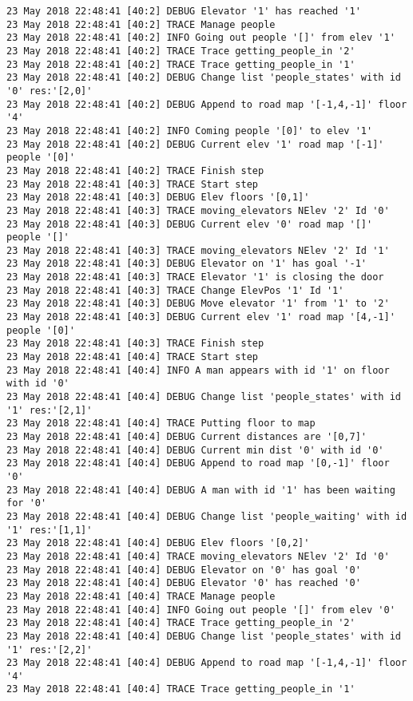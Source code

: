 \begin{lstlisting}[basicstyle=\scriptsize]
23 May 2018 22:48:41 [40:2] DEBUG Elevator '1' has reached '1'
23 May 2018 22:48:41 [40:2] TRACE Manage people
23 May 2018 22:48:41 [40:2] INFO Going out people '[]' from elev '1'
23 May 2018 22:48:41 [40:2] TRACE Trace getting_people_in '2'
23 May 2018 22:48:41 [40:2] TRACE Trace getting_people_in '1'
23 May 2018 22:48:41 [40:2] DEBUG Change list 'people_states' with id '0' res:'[2,0]'
23 May 2018 22:48:41 [40:2] DEBUG Append to road map '[-1,4,-1]' floor '4'
23 May 2018 22:48:41 [40:2] INFO Coming people '[0]' to elev '1'
23 May 2018 22:48:41 [40:2] DEBUG Current elev '1' road map '[-1]' people '[0]'
23 May 2018 22:48:41 [40:2] TRACE Finish step
23 May 2018 22:48:41 [40:3] TRACE Start step
23 May 2018 22:48:41 [40:3] DEBUG Elev floors '[0,1]'
23 May 2018 22:48:41 [40:3] TRACE moving_elevators NElev '2' Id '0'
23 May 2018 22:48:41 [40:3] DEBUG Current elev '0' road map '[]' people '[]'
23 May 2018 22:48:41 [40:3] TRACE moving_elevators NElev '2' Id '1'
23 May 2018 22:48:41 [40:3] DEBUG Elevator on '1' has goal '-1'
23 May 2018 22:48:41 [40:3] TRACE Elevator '1' is closing the door
23 May 2018 22:48:41 [40:3] TRACE Change ElevPos '1' Id '1'
23 May 2018 22:48:41 [40:3] DEBUG Move elevator '1' from '1' to '2'
23 May 2018 22:48:41 [40:3] DEBUG Current elev '1' road map '[4,-1]' people '[0]'
23 May 2018 22:48:41 [40:3] TRACE Finish step
23 May 2018 22:48:41 [40:4] TRACE Start step
23 May 2018 22:48:41 [40:4] INFO A man appears with id '1' on floor with id '0'
23 May 2018 22:48:41 [40:4] DEBUG Change list 'people_states' with id '1' res:'[2,1]'
23 May 2018 22:48:41 [40:4] TRACE Putting floor to map
23 May 2018 22:48:41 [40:4] DEBUG Current distances are '[0,7]'
23 May 2018 22:48:41 [40:4] DEBUG Current min dist '0' with id '0'
23 May 2018 22:48:41 [40:4] DEBUG Append to road map '[0,-1]' floor '0'
23 May 2018 22:48:41 [40:4] DEBUG A man with id '1' has been waiting for '0'
23 May 2018 22:48:41 [40:4] DEBUG Change list 'people_waiting' with id '1' res:'[1,1]'
23 May 2018 22:48:41 [40:4] DEBUG Elev floors '[0,2]'
23 May 2018 22:48:41 [40:4] TRACE moving_elevators NElev '2' Id '0'
23 May 2018 22:48:41 [40:4] DEBUG Elevator on '0' has goal '0'
23 May 2018 22:48:41 [40:4] DEBUG Elevator '0' has reached '0'
23 May 2018 22:48:41 [40:4] TRACE Manage people
23 May 2018 22:48:41 [40:4] INFO Going out people '[]' from elev '0'
23 May 2018 22:48:41 [40:4] TRACE Trace getting_people_in '2'
23 May 2018 22:48:41 [40:4] DEBUG Change list 'people_states' with id '1' res:'[2,2]'
23 May 2018 22:48:41 [40:4] DEBUG Append to road map '[-1,4,-1]' floor '4'
23 May 2018 22:48:41 [40:4] TRACE Trace getting_people_in '1'

\end{lstlisting}
